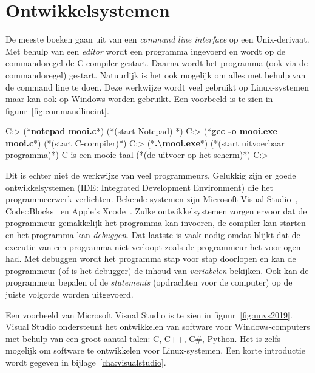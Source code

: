 \section{Ontwikkelsystemen}
De meeste boeken gaan uit van een \textsl{command line interface} op een Unix-derivaat. Met behulp van een \textsl{editor} wordt een programma ingevoerd en wordt op de commandoregel de C-compiler gestart. Daarna wordt het programma (ook via de commandoregel) gestart.
Natuurlijk is het ook mogelijk om alles met behulp van de command line te doen. Deze werkwijze wordt veel gebruikt op Linux-systemen maar kan ook op Windows worden gebruikt. Een voorbeeld is te zien in figuur~\ref{fig:commandlineint}.

\begin{dosbox}[title=Een voorbeeld van een command line interface.,label=fig:commandlineint]
C:\Users\Cbook> (*\textbf{notepad mooi.c}*) (*\hfill\textrm{(start Notepad)} *)
C:\Users\Cbook> (*\textbf{gcc -o mooi.exe mooi.c}*) (*\hfill\textrm{(start C-compiler)}*)
C:\Users\Cbook> (*\textbf{.\textbackslash mooi.exe}*) (*\hfill\textrm{(start uitvoerbaar programma)}*)
C is een mooie taal (*\hfill\textrm{(de uitvoer op het scherm)}*)
C:\Users\Cbook>
\end{dosbox}

Dit is echter niet de werkwijze van veel programmeurs. Gelukkig zijn er goede ontwikkelsystemen (IDE: Integrated Development Environment) die het programmeerwerk verlichten. Bekende systemen zijn Microsoft Visual Studio~\cite{vs2019}, Code::Blocks~\cite{codeblocks2020} en Apple's Xcode~\cite{xcode2020}.
Zulke ontwikkelsystemen zorgen ervoor dat de programmeur gemakkelijk het programma kan invoeren, de compiler kan starten en het programma kan \textsl{debuggen}. Dat laatste is vaak nodig omdat blijkt dat de executie van een programma niet verloopt zoals de programmeur het voor ogen had. Met debuggen wordt het programma stap voor stap doorlopen en kan de programmeur (of is het debugger) de inhoud van \textsl{variabelen} bekijken. Ook kan de programmeur bepalen of de \textsl{statements} (opdrachten voor de computer) op de juiste volgorde worden uitgevoerd.

Een voorbeeld van Microsoft Visual Studio is te zien in figuur~\ref{fig:unvs2019}. Visual Studio ondersteunt het ontwikkelen van software voor Windows-computers met behulp van een groot aantal talen: C, C++, C\#, Python. Het is zelfs mogelijk om software te ontwikkelen voor Linux-systemen. Een korte introductie wordt gegeven in bijlage~\ref{cha:visualstudio}.

